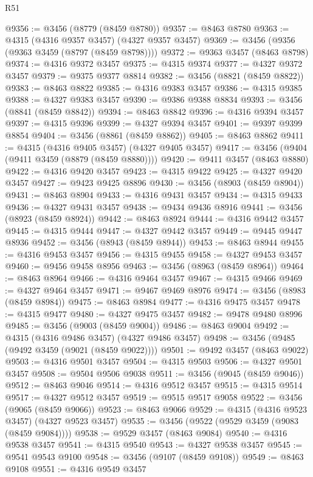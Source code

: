 \begin{lexlean}{R51}
\begin{coremodule}
@9356 := @3456 (@8779 (@8459 @8780))
@9357 := @8463 @8780
@9363 := @4315 (@4316 @9357 @3457) (@4327 @9357 @3457)
@9369 := @3456 (@9356 (@9363 @3459 (@8797 (@8459 @8798))))
@9372 := @9363 @3457 (@8463 @8798)
@9374 := @4316 @9372 @3457
@9375 := @4315 @9374
@9377 := @4327 @9372 @3457
@9379 := @9375 @9377 @8814
@9382 := @3456 (@8821 (@8459 @8822))
@9383 := @8463 @8822
@9385 := @4316 @9383 @3457
@9386 := @4315 @9385
@9388 := @4327 @9383 @3457
@9390 := @9386 @9388 @8834
@9393 := @3456 (@8841 (@8459 @8842))
@9394 := @8463 @8842
@9396 := @4316 @9394 @3457
@9397 := @4315 @9396
@9399 := @4327 @9394 @3457
@9401 := @9397 @9399 @8854
@9404 := @3456 (@8861 (@8459 @8862))
@9405 := @8463 @8862
@9411 := @4315 (@4316 @9405 @3457) (@4327 @9405 @3457)
@9417 := @3456 (@9404 (@9411 @3459 (@8879 (@8459 @8880))))
@9420 := @9411 @3457 (@8463 @8880)
@9422 := @4316 @9420 @3457
@9423 := @4315 @9422
@9425 := @4327 @9420 @3457
@9427 := @9423 @9425 @8896
@9430 := @3456 (@8903 (@8459 @8904))
@9431 := @8463 @8904
@9433 := @4316 @9431 @3457
@9434 := @4315 @9433
@9436 := @4327 @9431 @3457
@9438 := @9434 @9436 @8916
@9441 := @3456 (@8923 (@8459 @8924))
@9442 := @8463 @8924
@9444 := @4316 @9442 @3457
@9445 := @4315 @9444
@9447 := @4327 @9442 @3457
@9449 := @9445 @9447 @8936
@9452 := @3456 (@8943 (@8459 @8944))
@9453 := @8463 @8944
@9455 := @4316 @9453 @3457
@9456 := @4315 @9455
@9458 := @4327 @9453 @3457
@9460 := @9456 @9458 @8956
@9463 := @3456 (@8963 (@8459 @8964))
@9464 := @8463 @8964
@9466 := @4316 @9464 @3457
@9467 := @4315 @9466
@9469 := @4327 @9464 @3457
@9471 := @9467 @9469 @8976
@9474 := @3456 (@8983 (@8459 @8984))
@9475 := @8463 @8984
@9477 := @4316 @9475 @3457
@9478 := @4315 @9477
@9480 := @4327 @9475 @3457
@9482 := @9478 @9480 @8996
@9485 := @3456 (@9003 (@8459 @9004))
@9486 := @8463 @9004
@9492 := @4315 (@4316 @9486 @3457) (@4327 @9486 @3457)
@9498 := @3456 (@9485 (@9492 @3459 (@9021 (@8459 @9022))))
@9501 := @9492 @3457 (@8463 @9022)
@9503 := @4316 @9501 @3457
@9504 := @4315 @9503
@9506 := @4327 @9501 @3457
@9508 := @9504 @9506 @9038
@9511 := @3456 (@9045 (@8459 @9046))
@9512 := @8463 @9046
@9514 := @4316 @9512 @3457
@9515 := @4315 @9514
@9517 := @4327 @9512 @3457
@9519 := @9515 @9517 @9058
@9522 := @3456 (@9065 (@8459 @9066))
@9523 := @8463 @9066
@9529 := @4315 (@4316 @9523 @3457) (@4327 @9523 @3457)
@9535 := @3456 (@9522 (@9529 @3459 (@9083 (@8459 @9084))))
@9538 := @9529 @3457 (@8463 @9084)
@9540 := @4316 @9538 @3457
@9541 := @4315 @9540
@9543 := @4327 @9538 @3457
@9545 := @9541 @9543 @9100
@9548 := @3456 (@9107 (@8459 @9108))
@9549 := @8463 @9108
@9551 := @4316 @9549 @3457

\end{coremodule}
\end{lexlean}
